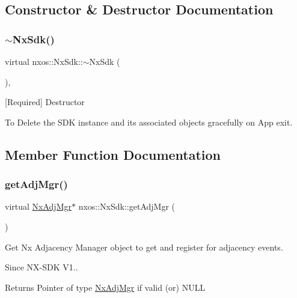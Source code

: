 \subsection{Constructor \& Destructor Documentation}
\mbox{\label{classnxos_1_1_nx_sdk_a6b5028045019af4be6c8356ec0fdaff9}} 
\subsubsection{\texorpdfstring{$\sim$\+Nx\+Sdk()}{~NxSdk()}}
{\footnotesize\ttfamily virtual nxos\+::\+Nx\+Sdk\+::$\sim$\+Nx\+Sdk (\begin{DoxyParamCaption}{ }\end{DoxyParamCaption})\hspace{0.3cm}{\ttfamily [inline]}, {\ttfamily [virtual]}}

\mbox{[}Required\mbox{]} Destructor

To Delete the S\+DK instance and its associated objects gracefully on App exit. 

\subsection{Member Function Documentation}
\mbox{\label{classnxos_1_1_nx_sdk_af6e3db3e34b003693d765835ea0dbb49}} 
\subsubsection{\texorpdfstring{get\+Adj\+Mgr()}{getAdjMgr()}}
{\footnotesize\ttfamily virtual \mbox{\hyperlink{classnxos_1_1_nx_adj_mgr}{Nx\+Adj\+Mgr}}$\ast$ nxos\+::\+Nx\+Sdk\+::get\+Adj\+Mgr (\begin{DoxyParamCaption}{ }\end{DoxyParamCaption})\hspace{0.3cm}{\ttfamily [pure virtual]}}

Get Nx Adjacency Manager object to get and register for adjacency events.

\begin{DoxySince}{Since}
N\+X-\/\+S\+DK V1..
\end{DoxySince}
\begin{DoxyReturn}{Returns}
Pointer of type \mbox{\hyperlink{classnxos_1_1_nx_adj_mgr}{Nx\+Adj\+Mgr}} if valid (or) N\+U\+LL 
\end{DoxyReturn}
\mbox{\label{classnxos_1_1_nx_sdk_ad6964fa8ee52a8b0a22c27abdcf871e3}} 
